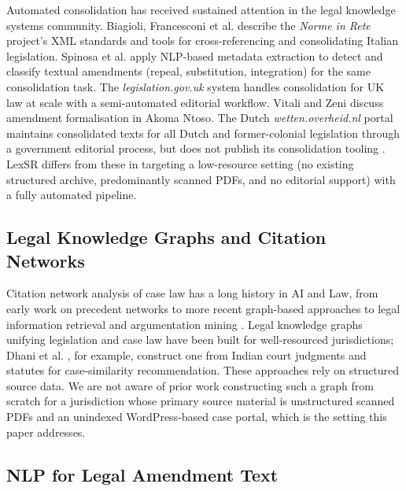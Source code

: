 \documentclass{IOS-Book-Article}
\begin{document}
Automated consolidation has received sustained attention in the legal knowledge systems
community. Biagioli, Francesconi et al. \cite{francesconi2004} describe the \emph{Norme in
Rete} project's XML standards and tools for cross-referencing and consolidating Italian
legislation. Spinosa et al. \cite{spinosa2009} apply NLP-based metadata extraction to detect
and classify textual amendments (repeal, substitution, integration) for the same
consolidation task. The \emph{legislation.gov.uk} system \cite{sheridan2010}
handles consolidation for UK law at scale with a semi-automated editorial workflow. Vitali
and Zeni \cite{vitali2007} discuss amendment formalisation in Akoma Ntoso. The Dutch
\emph{wetten.overheid.nl} portal maintains consolidated texts for all Dutch and former-colonial
legislation through a government editorial process, but does not publish its consolidation
tooling \cite{koop2022}. LexSR differs from these in targeting a low-resource setting (no
existing structured archive, predominantly scanned PDFs, and no editorial support) with a
fully automated pipeline.

\subsection{Legal Knowledge Graphs and Citation Networks}

Citation network analysis of case law has a long history in AI and Law, from early work on
precedent networks to more recent graph-based approaches to legal information retrieval and
argumentation mining \cite{benchcapon2012}. Legal knowledge graphs unifying legislation
and case law have been built for well-resourced jurisdictions; Dhani et al.
\cite{dhani2021}, for example, construct one from Indian court judgments and statutes for
case-similarity recommendation. These approaches rely on structured source data. We are
not aware of prior work constructing such a graph from scratch for a jurisdiction whose
primary source material is unstructured scanned PDFs and an unindexed WordPress-based case
portal, which is the setting this paper addresses.

\subsection{NLP for Legal Amendment Text}
\end{document}
